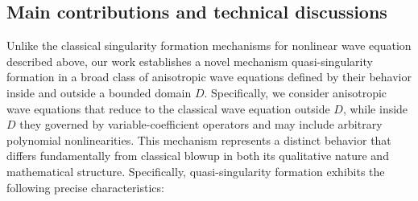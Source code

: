 \documentclass[11pt,reqno,oneside]{amsart}
\numberwithin{equation}{section}
\theoremstyle{definition}
\theoremstyle{remark}
\numberwithin{equation}{section}
\begin{document}
	\subsection{Main contributions and technical discussions}\label{subsection 1.3}
	
	
	
	Unlike the classical singularity formation mechanisms for nonlinear wave equation described above, our work establishes a novel mechanism  quasi-singularity formation in a broad class of anisotropic wave equations defined by their behavior inside and outside a bounded domain $D$. Specifically, we consider anisotropic wave equations that reduce to the classical wave equation outside $D$, while inside $D$ they governed by variable-coefficient operators and may include arbitrary polynomial nonlinearities. This mechanism represents a distinct behavior that differs fundamentally from classical blowup in both its qualitative nature and mathematical structure. Specifically, quasi-singularity formation exhibits the following precise characteristics:
\end{document}
